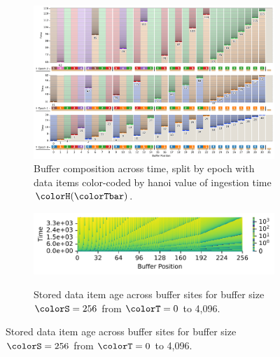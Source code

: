\begin{figure}[htbp!]
  \centering

\begin{subfigure}[b]{\linewidth}
\includegraphics[width=\linewidth]{
binder/teeplots/11/num-generations=128+reservation-mode=steady+surface-size=32+viz=site-reservation-by-rank-spliced-at-heatmap+ext=}
\vspace{-4ex}\caption{
  Buffer composition across time, split by epoch with data items color-coded by hanoi value of ingestion time $\colorH(\colorTbar)$.
}
\label{fig:hsurf-steady-implementation-schematic}
\end{subfigure}

\vspace{1ex}\begin{minipage}[]{\textwidth}
 \vspace{-2pt}
  \begin{subfigure}[t]{0.7\linewidth}
    \vspace{0pt}
    \centering
  \includegraphics[width=0.88\linewidth,clip]{binder/teeplots/11/cnorm=log+num-generations=4096+surface-size=256+viz=site-ingest-depth-by-rank-heatmap+ynorm=linear+ext=}
  \end{subfigure}%
  \begin{subfigure}[t]{0.3\linewidth}
  \vspace{-2pt}
  \caption{%
    Stored data item age across buffer sites for buffer size $\colorS=256$ from $\colorT=0$ to 4,096.
  }
  \label{fig:hsurf-steady-implementation-heatmap}
\end{subfigure}
\end{minipage}


\end{figure}
